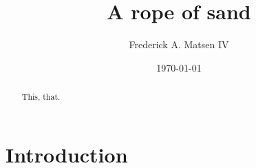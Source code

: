 \documentclass{amsart}
\title{A rope of sand}
\author[Matsen]{Frederick A. Matsen IV}
\date{\today}
\begin{document}
\begin{abstract}
This, that.
\end{abstract}

\maketitle

\section{Introduction}
\end{document}
